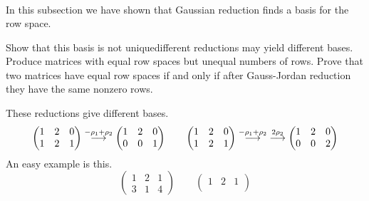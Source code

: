 \begin{exercises}
\begin{answer}
\begin{align*}
      \end{align*}  
    \end{answer}
  \recommended \item  
    In this subsection we have shown that 
    Gaussian reduction finds a basis for the row space.
    \begin{exparts}
      \partsitem Show that 
        this basis is not unique\Dash different reductions may yield
        different bases.
      \partsitem Produce matrices with equal row spaces but unequal numbers of
        rows.
      \partsitem Prove that two matrices have equal row spaces if and
        only if after
        Gauss-Jordan reduction they have the same nonzero rows.
    \end{exparts}
    \begin{answer}
      \begin{exparts}
        \partsitem These reductions give different bases.
          \begin{equation*}
            \begin{pmatrix}
              1  &2  &0  \\
              1  &2  &1
            \end{pmatrix}
            \mathrel{ \mathop{\longrightarrow}\limits^{-\rho_1+\rho_2\mathstrut}_{ \begin{subarray}{l} \relax \end{subarray}}}
            \begin{pmatrix}
              1  &2  &0  \\
              0  &0  &1
            \end{pmatrix}
            \qquad
            \begin{pmatrix}
              1  &2  &0  \\
              1  &2  &1
            \end{pmatrix}
            \mathrel{ \mathop{\longrightarrow}\limits^{-\rho_1+\rho_2\mathstrut}_{ \begin{subarray}{l} \relax \end{subarray}}}
            \;\mathrel{ \mathop{\longrightarrow}\limits^{2\rho_2\mathstrut}_{ \begin{subarray}{l} \relax \end{subarray}}}
            \begin{pmatrix}
              1  &2  &0  \\
              0  &0  &2
            \end{pmatrix}
          \end{equation*}
        \partsitem An easy example is this.
          \begin{equation*}
            \begin{pmatrix}
              1  &2  &1  \\
              3  &1  &4
            \end{pmatrix}
            \qquad
            \begin{pmatrix}
              1  &2  &1  \\

\end{pmatrix}
\end{equation*}
\end{exparts}
\end{answer}
\end{exercises}
